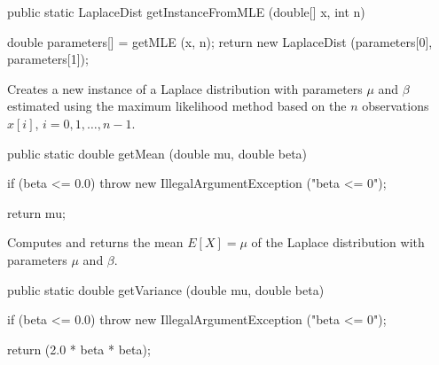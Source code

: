 \begin{htmlonly}
\end{htmlonly}
\begin{code}

   public static LaplaceDist getInstanceFromMLE (double[] x, int n)\begin{hide} {
      double parameters[] = getMLE (x, n);
      return new LaplaceDist (parameters[0], parameters[1]);
   }\end{hide}
\end{code}
\begin{tabb}
   Creates a new instance of a Laplace distribution with parameters $\mu$
   and $\beta$ estimated using the maximum likelihood method based on the
   $n$ observations $x[i]$, $i = 0, 1, \ldots, n-1$.
\end{tabb}
\begin{htmlonly}
\end{htmlonly}
\begin{code}

   public static double getMean (double mu, double beta)\begin{hide} {
      if (beta <= 0.0)
         throw new IllegalArgumentException ("beta <= 0");

      return mu;
   }\end{hide}
\end{code}
\begin{tabb}  Computes and returns the mean $E[X] = \mu$ of the Laplace
   distribution with parameters $\mu$ and $\beta$.
\end{tabb}
\begin{htmlonly}
\end{htmlonly}
\begin{code}

   public static double getVariance (double mu, double beta)\begin{hide} {
      if (beta <= 0.0)
         throw new IllegalArgumentException ("beta <= 0");

      return (2.0 * beta * beta);
   }\end{hide}
\end{code}
